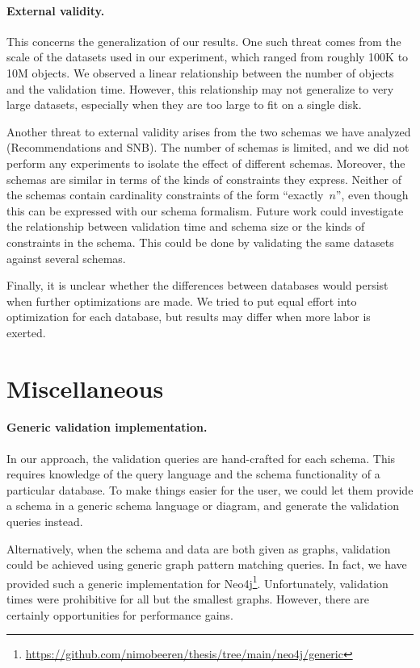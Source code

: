 \documentclass{report}
\theoremstyle{definition}
\begin{document}
\paragraph{External validity.} This concerns the generalization of our results. One such threat comes from the scale of the datasets used in our experiment, which ranged from roughly 100K to 10M objects. We observed a linear relationship between the number of objects and the validation time. However, this relationship may not generalize to very large datasets, especially when they are too large to fit on a single disk.

Another threat to external validity arises from the two schemas we have analyzed (Recommendations and SNB). The number of schemas is limited, and we did not perform any experiments to isolate the effect of different schemas. Moreover, the schemas are similar in terms of the kinds of constraints they express. Neither of the schemas contain cardinality constraints of the form ``exactly~$n$'', even though this can be expressed with our schema formalism. Future work could investigate the relationship between validation time and schema size or the kinds of constraints in the schema. This could be done by validating the same datasets against several schemas.

Finally, it is unclear whether the differences between databases would persist when further optimizations are made. We tried to put equal effort into optimization for each database, but results may differ when more labor is exerted.

\section{Miscellaneous}

\paragraph{Generic validation implementation.} In our approach, the validation queries are hand-crafted for each schema. This requires knowledge of the query language and the schema functionality of a particular database. To make things easier for the user, we could let them provide a schema in a generic schema language or diagram, and generate the validation queries instead.

Alternatively, when the schema and data are both given as graphs, validation could be achieved using generic graph pattern matching queries. In fact, we have provided such a generic implementation for Neo4j\footnote{\url{https://github.com/nimobeeren/thesis/tree/main/neo4j/generic}}. Unfortunately, validation times were prohibitive for all but the smallest graphs. However, there are certainly opportunities for performance gains.
\end{document}
